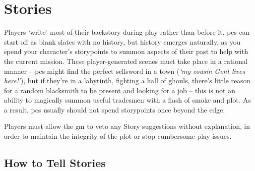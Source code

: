 \chapter[House of Stories]{Stories}
\label{stories}

Players `write' most of their backstory during play rather than before it.
\Glspl{pc} can start off as blank slates with no history, but history emerges naturally, as you spend your character's \glspl{storypoint} to summon aspects of their past to help with the current mission.
These player-generated scenes must take place in a rational manner -- \glspl{pc} might find the perfect sellsword in a town (\textit{`my cousin Gent lives here!'}), but if they're in a labyrinth, fighting a hall of ghouls, there's little reason for a random blacksmith to be present and looking for a job -- this is not an ability to magically summon useful tradesmen with a flash of smoke and plot.
As a result, \glspl{pc} usually should not spend \glspl{storypoint} once beyond the \gls{edge}.

Players must allow the \gls{gm} to veto any Story suggestions without explanation, in order to maintain the integrity of the plot or stop cumbersome play issues.

\section{How to Tell Stories}
\label{listOfStories}

